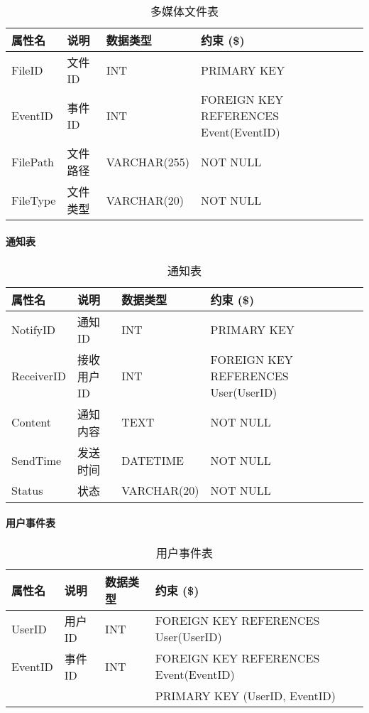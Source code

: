 \begin{table}[!hpt]
    \caption{多媒体文件表}
    \label{tab:rela-mediafile}
    \centering
    \begin{tabular}{@{}llll@{}} \toprule
        \textbf{属性名} & \textbf{说明} & \textbf{数据类型} & \textbf{约束} (\$) \\ \midrule
        FileID & 文件ID & INT & PRIMARY KEY \\
        EventID & 事件ID & INT & FOREIGN KEY REFERENCES Event(EventID) \\
        FilePath & 文件路径 & VARCHAR(255) & NOT NULL \\
        FileType & 文件类型 & VARCHAR(20) & NOT NULL \\ \bottomrule
    \end{tabular}
\end{table}

\paragraph{通知表}

\begin{table}[!hpt]
    \caption{通知表}
    \label{tab:rela-notification}
    \centering
    \begin{tabular}{@{}llll@{}} \toprule
        \textbf{属性名} & \textbf{说明} & \textbf{数据类型} & \textbf{约束} (\$) \\ \midrule
        NotifyID & 通知ID & INT & PRIMARY KEY \\
        ReceiverID & 接收用户ID & INT & FOREIGN KEY REFERENCES User(UserID) \\
        Content & 通知内容 & TEXT & NOT NULL \\
        SendTime & 发送时间 & DATETIME & NOT NULL \\
        Status & 状态 & VARCHAR(20) & NOT NULL \\ \bottomrule
    \end{tabular}
\end{table}

\paragraph{用户事件表}

\begin{table}[!hpt]
    \caption{用户事件表}
    \label{tab:rela-user-event}
    \centering
    \begin{tabular}{@{}llll@{}} \toprule
        \textbf{属性名} & \textbf{说明} & \textbf{数据类型} & \textbf{约束} (\$) \\ \midrule
        UserID & 用户ID & INT & FOREIGN KEY REFERENCES User(UserID) \\
        EventID & 事件ID & INT & FOREIGN KEY REFERENCES Event(EventID) \\
         & & & PRIMARY KEY (UserID, EventID) \\ \bottomrule
    \end{tabular}
\end{table}

